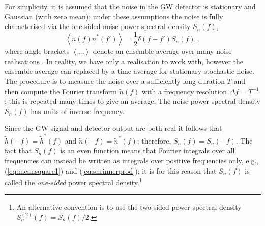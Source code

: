 For simplicity, it is assumed that the noise in the GW detector is stationary and Gaussian (with zero mean); under these assumptions the noise is fully characterised via the one-sided noise power spectral density $S_{n}(f)$, 
\begin{equation}\label{eq:psd}
\left<\tilde{n}(f)\tilde{n}^{*}(f')\right>=\frac{1}{2}\delta (f-f')S_{n}(f) \; ,
\end{equation}
where angle brackets $\left<\ldots\right>$ denote an ensemble average over many noise realisations \citep{Cutler1994}. In reality, we have only a realisation to work with, however the ensemble average can replaced by a time average for stationary stochastic noise. The procedure is to measure the noise over a sufficiently long duration $T$ and then compute the Fourier transform $\tilde{n}(f)$ with a frequency resolution $\Delta f = T^{-1}$; this is repeated many times to give an average. The noise power spectral density $S_{n}(f)$ has units of inverse frequency.

Since the GW signal and detector output are both real it follows that $\tilde{h}(-f)=\tilde{h}^{*}(f)$ and $\tilde{n}(-f)=\tilde{n}^{*}(f)$; therefore, $S_{n}(f)=S_{n}(-f)$. The fact that $S_{n}(f)$ is an even function means that Fourier integrals over all frequencies can instead be written as integrals over positive frequencies only, e.g., (\ref{eq:meansquare1}) and (\ref{eq:snrinnerprod}); it is for this reason that $S_{n}(f)$ is called the \emph{one-sided} power spectral density.\footnote{An alternative convention is to use the two-sided power spectral density $S^{(2)}_{n}(f) = S_{n}(f)/2$.}

